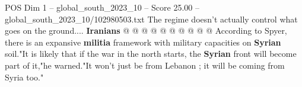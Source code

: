 \begin{textsample}{POS Dim 1 – global\_south\_2023\_10 – Score 25.00 – global\_south\_2023\_10/102980503.txt}
The regime doesn't actually control what goes on the ground.... \textbf{Iranians} @ @ @ @ @ @ @ @ @ @ According to Spyer, there is an expansive \textbf{militia} framework with military capacities on \textbf{Syrian} soil."It is likely that if the war in the north starts, the \textbf{Syrian} front will become part of it,"he warned."It won't just be from Lebanon ; it will be coming from Syria too."

\end{textsample}
